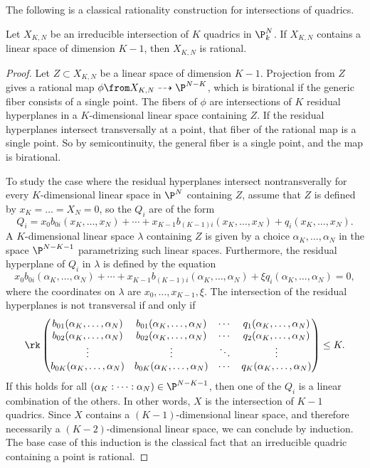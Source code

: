 The following is a classical rationality construction for intersections of quadrics.
\begin{proposition}
	\label{prop:RationalFromLinearSpace}
	Let $X_{K,N}$ be an irreducible intersection of $K$ quadrics in $\P_k^N$. If $X_{K,N}$ contains a linear space of dimension $K-1$, then $X_{K,N}$ is rational.
\end{proposition}
\begin{proof}
	Let $Z \subset X_{K,N}$ be a linear space of dimension $K-1$. Projection from $Z$ gives a rational map $\phi \from X_{K,N} \dashrightarrow \P^{N-K}$, which is birational if the generic fiber consists of a single point. The fibers of $\phi$ are intersections of $K$ residual hyperplanes in a $K$-dimensional linear space containing $Z$. If the residual hyperplanes intersect transversally at a point, that fiber of the rational map is a single point. So by semicontinuity, the general fiber is a single point, and the map is birational.

To study the case where the residual hyperplanes intersect nontransverally for every $K$-dimensional linear space in $\P^N$ containing $Z$, assume that $Z$ is defined by $x_{K} = \dots = X_N = 0$, so the $Q_i$ are of the form
\[Q_i = x_0 b_{0i}(x_K,\dots,x_N) + \cdots + x_{K-1}b_{(K-1)i}(x_K,\dots,x_N) + q_i(x_K,\dots,x_N). \]
A $K$-dimensional linear space $\lambda$ containing $Z$ is given by a choice $\alpha_{K},\dots,\alpha_N$ in the space $\P^{N-K-1}$ parametrizing such linear spaces. Furthermore, the residual hyperplane of $Q_i$ in $\lambda$ is defined by the equation
\[x_0 b_{0i}(\alpha_K,\dots,\alpha_N) + \cdots + x_{K-1}b_{(K-1)i}(\alpha_K,\dots,\alpha_N) + \xi q_i(\alpha_K,\dots,\alpha_N) = 0, \]
where the coordinates on $\lambda$ are $x_0,\dots,x_{K-1},\xi$. The intersection of the residual hyperplanes is not transversal if and only if
\begin{equation*}
  \rk
  \begin{pmatrix}
    b_{01}(\alpha_K,\dots,\alpha_N) & b_{01}(\alpha_K,\dots,\alpha_N) & \cdots & q_1(\alpha_K,\dots,\alpha_N) \\
        b_{02}(\alpha_K,\dots,\alpha_N) & b_{02}(\alpha_K,\dots,\alpha_N) & \cdots & q_2(\alpha_K,\dots,\alpha_N) \\
        \vdots & \vdots & \ddots & \vdots \\
    b_{0K}(\alpha_K,\dots,\alpha_N) & b_{0K}(\alpha_K,\dots,\alpha_N) & \cdots & q_K(\alpha_K,\dots,\alpha_N) \\
  \end{pmatrix}
\leq K.
\end{equation*}
If this holds for all $(\alpha_K:\dots:\alpha_N) \in \P^{N-K-1}$, then one of the $Q_i$ is a linear combination of the others. In other words, $X$ is the intersection of $K-1$ quadrics. Since $X$ contains a $(K-1)$-dimensional linear space, and therefore necessarily a $(K-2)$-dimensional linear space, we can conclude by induction. The base case of this induction is the classical fact that an irreducible quadric containing a point is rational.
\end{proof}

